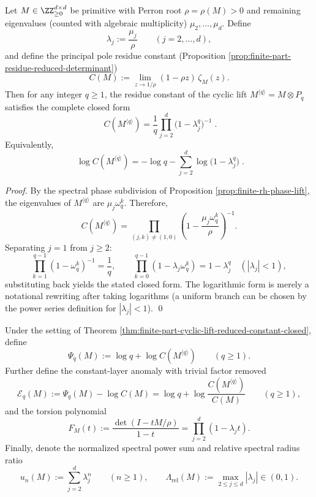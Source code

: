 \begin{theorem}\label{thm:finite-part-cyclic-lift-reduced-constant-closed}
Let \(M\in\ZZ_{\ge 0}^{d\times d}\) be primitive with Perron root \(\rho=\rho(M)>0\) and remaining eigenvalues (counted with algebraic multiplicity) \(\mu_2,\dots,\mu_d\).
Define
\[
\lambda_j:=\frac{\mu_j}{\rho}\qquad(j=2,\dots,d),
\]
and define the principal pole residue constant (Proposition \ref{prop:finite-part-residue-reduced-determinant})
\[
C(M):=\lim_{z\to 1/\rho}(1-\rho z)\,\zeta_M(z).
\]
Then for any integer \(q\ge 1\), the residue constant of the cyclic lift \(M^{\langle q\rangle}=M\otimes P_q\) satisfies the complete closed form
\[
\boxed{\;
C(M^{\langle q\rangle})
=\frac{1}{q}\prod_{j=2}^{d}\bigl(1-\lambda_j^{q}\bigr)^{-1}\; }.
\]
Equivalently,
\[
\boxed{\;
\log C(M^{\langle q\rangle})
=-\log q-\sum_{j=2}^{d}\log\!\bigl(1-\lambda_j^{q}\bigr)\; }.
\]
\end{theorem}
\begin{proof}
By the spectral phase subdivision of Proposition \ref{prop:finite-rh-phase-lift}, the eigenvalues of \(M^{\langle q\rangle}\) are \(\mu_j\omega_q^k\).
Therefore,
\[
C(M^{\langle q\rangle})
=\prod_{(j,k)\neq(1,0)}\left(1-\frac{\mu_j\omega_q^k}{\rho}\right)^{-1}.
\]
Separating \(j=1\) from \(j\ge 2\):
\[
\prod_{k=1}^{q-1}(1-\omega_q^k)^{-1}=\frac{1}{q},
\qquad
\prod_{k=0}^{q-1}\left(1-\lambda_j\omega_q^k\right)=1-\lambda_j^{q}\quad(|\lambda_j|<1),
\]
substituting back yields the stated closed form.
The logarithmic form is merely a notational rewriting after taking logarithms (a uniform branch can be chosen by the power series definition for \(|\lambda_j|<1\)). \qed
\end{proof}

\begin{definition}\label{def:finite-part-cyclic-lift-psi}
Under the setting of Theorem \ref{thm:finite-part-cyclic-lift-reduced-constant-closed}, define
\[
\Psi_q(M):=\log q+\log C(M^{\langle q\rangle})\qquad(q\ge 1).
\]
Further define the constant-layer anomaly with trivial factor removed
\[
\mathcal{E}_q(M):=\Psi_q(M)-\log C(M)
=\log q+\log\frac{C(M^{\langle q\rangle})}{C(M)}\qquad(q\ge 1),
\]
and the torsion polynomial
\[
F_M(t):=\frac{\det(I-tM/\rho)}{1-t}=\prod_{j=2}^{d}(1-\lambda_j t).
\]
Finally, denote the normalized spectral power sum and relative spectral radius ratio
\[
u_n(M):=\sum_{j=2}^{d}\lambda_j^{n}\qquad(n\ge 1),
\qquad
\Lambda_{\mathrm{rel}}(M):=\max_{2\le j\le d}|\lambda_j|\in(0,1).
\]
\end{definition}

